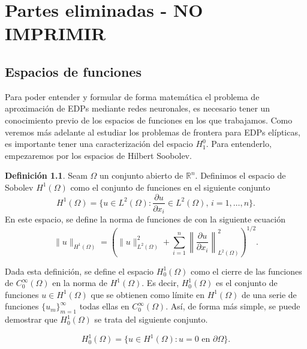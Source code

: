 \documentclass[a4paper,11pt,spanish, twoside, leqno]{tfg-uam}
\theoremstyle{definition}
\newtheorem{defin}[teor]{Definici\'on}
\begin{document}
\chapter{Partes eliminadas - NO IMPRIMIR}
\section{Espacios de funciones}

Para poder entender y formular de forma matemática el problema de aproximación de EDPs mediante redes neuronales, es necesario tener un conocimiento previo de los espacios de funciones en los que trabajamos. Como veremos más adelante al estudiar los problemas de frontera para EDPs elípticas, es importante tener una caracterización del espacio $H_1^0$. Para entenderlo, empezaremos por los espacios de Hilbert Soobolev.

\begin{mdframed}
\begin{defin}
    Seam $\Omega$ un conjunto abierto de $\mathbb{R}^n$. Definimos el espacio de Sobolev $H^1(\Omega)$ como el conjunto de funciones en el siguiente conjunto
    \begin{equation}
        H^1(\Omega)=\{u\in L^2(\Omega): \frac{\partial u}{\partial x_i}\in L^2(\Omega), \, i=1,\dots,n\}.
    \end{equation}
    En este espacio, se define la norma de funciones de con la siguiente ecuación
    \begin{equation}
        \|u\|_{H^1(\Omega)}=\left(\|u\|^2_{L^2(\Omega)} + \sum_{i=1}^{n}\left\|\frac{\partial u}{\partial x_i}\right\|^2_{L^2(\Omega)}\right)^{1/2}.
    \end{equation}
\end{defin}
\end{mdframed}

Dada esta definición, se define el espacio $H_0^1(\Omega)$ como el cierre de las funciones de $C_0^\infty(\Omega)$ en la norma de $H^1(\Omega)$. Es decir, $H_0^1(\Omega)$ es el conjunto de funciones $u\in H^1(\Omega)$ que se obtienen como límite en $H^1(\Omega)$ de una serie de funciones $\{u_m\}_{m=1}^\infty$ todas ellas en $C_0^\infty(\Omega)$. Así, de forma más simple, se puede demostrar que $H_0^1(\Omega)$ se trata del siguiente conjunto.

\begin{equation}
    H_0^1(\Omega)=\{u\in H^1(\Omega): u=0 \text{ en } \partial\Omega\}.
\end{equation}
\end{document}
